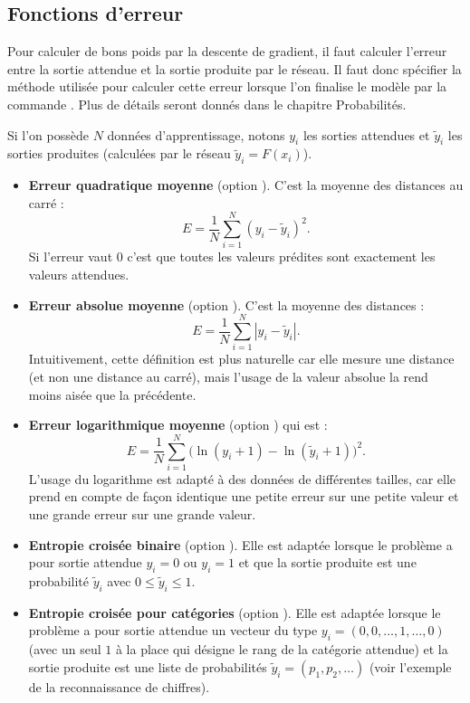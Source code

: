 \documentclass[11pt,class=report,crop=false]{standalone}
\begin{document}
\subsection{Fonctions d'erreur}


Pour calculer de bons poids par la descente de gradient, il faut calculer l'erreur entre la sortie attendue et la sortie produite par le réseau. Il faut donc spécifier la méthode utilisée pour calculer cette erreur lorsque l'on finalise le modèle par la commande .
Plus de détails seront donnés dans le chapitre \og{}Probabilités\fg{}.

Si l'on possède $N$ données d'apprentissage, notons $y_i$ les sorties attendues et $\widetilde y_i$ les sorties produites (calculées par le réseau $\widetilde y_i = F(x_i)$).

\begin{itemize}
  \item \textbf{Erreur quadratique moyenne} (option ). C'est la moyenne des distances au carré :
  $$E = \frac{1}{N} \sum_{i=1}^N (y_i-\widetilde y_i)^2.$$
  Si l'erreur vaut $0$ c'est que toutes les valeurs prédites sont exactement les valeurs attendues.
  
  \item \textbf{Erreur absolue moyenne} (option ). C'est la moyenne des distances :
  $$E = \frac{1}{N} \sum_{i=1}^N |y_i-\widetilde y_i|.$$
  Intuitivement, cette définition est plus naturelle car elle mesure une distance (et non une distance au carré), mais l'usage de la valeur absolue la rend moins aisée que la précédente.
  
  \item \textbf{Erreur logarithmique moyenne} (option ) qui est :
  $$E = \frac{1}{N} \sum_{i=1}^N \big(\ln(y_i+1) - \ln(\widetilde y_i+1)\big)^2.$$
  L'usage du logarithme est adapté à des données de différentes tailles, car elle prend en compte de façon identique une petite erreur sur une petite valeur et une grande erreur sur une grande valeur.
  
  
  \item \textbf{Entropie croisée binaire} (option ). Elle est adaptée lorsque le problème a pour sortie attendue $y_i=0$ ou $y_i=1$ et que la sortie produite est une probabilité $\widetilde y_i$ avec $0 \le \widetilde y_i \le 1$.
  
  
  \item \textbf{Entropie croisée pour catégories}  (option ). Elle est adaptée lorsque le problème a pour sortie attendue un vecteur du type $y_i=(0,0,\ldots,1,\ldots,0)$ (avec un seul $1$ à la place qui désigne le rang de la catégorie attendue) et la sortie produite est une liste de probabilités $\widetilde y_i = (p_1,p_2,\ldots)$ (voir l'exemple de la reconnaissance de chiffres).
\end{itemize}
\end{document}
